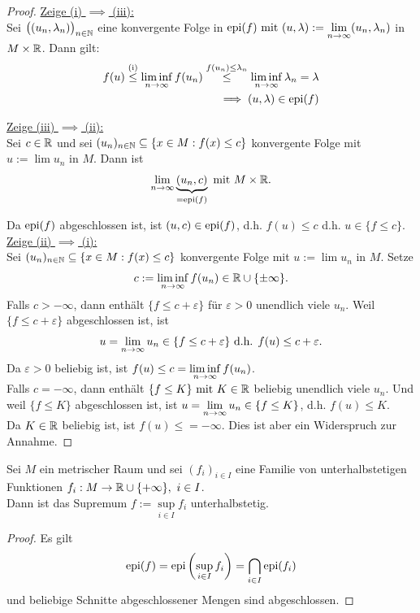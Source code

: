 \begin{proof}
\underline{Zeige (i) $\implies$ (iii):}\\
Sei $\big((u_n,\lambda_n)\big)_{n\in\mathbb{N}}$ eine konvergente Folge in $\text{epi}(f)\text{ mit }(u,\lambda):=\lim\limits_{n\to\infty}(u_n,\lambda_n)$ in $M\times\mathbb{R}$. Dann gilt:
\begin{align*}
f(u)
\stackrel{\text{(i)}}{\leq}
\liminf\limits_{n\to\infty} f(u_n)
\stackrel{f(u_n)\leq\lambda_n}{\leq}
\liminf\limits_{n\to\infty} \lambda_n
=\lambda\\
\implies
(u,\lambda)\in\text{epi}(f)
\end{align*}

\underline{Zeige (iii) $\implies$ (ii):}\\
Sei $c\in\mathbb{R}$ und sei $(u_n)_{n\in\mathbb{N}}\subseteq\lbrace x\in M:f(x)\leq c\rbrace$ konvergente Folge mit $u:=\lim u_n$ in $M$. 
Dann ist
\begin{align*}
	\lim\limits_{n\to\infty}\underbrace{(u_n,c)}_{=\text{epi}(f)}\text{ mit } M\times\mathbb{R}.
\end{align*}

Da $\text{epi}(f)$ abgeschlossen ist, ist $(u,c)\in\text{epi}(f)$, d.h. $f(u)\leq c$ d.h. $u\in\lbrace f\leq c\rbrace$.\\

\underline{Zeige (ii) $\implies$ (i):}\\
Sei $(u_n)_{n\in\mathbb{N}}\subseteq\lbrace x\in M:f(x)\leq c\rbrace$ konvergente Folge mit $u:=\lim u_n$ in $M$. Setze
\begin{align*}
c:=\liminf\limits_{n\to\infty} f(u_n)\in\mathbb{R}\cup\lbrace\pm\infty\rbrace.
\end{align*}
Falls $c>-\infty$, dann enthält $\lbrace f\leq c+\varepsilon\rbrace$ für $\varepsilon>0$ unendlich viele $u_n$. Weil $\lbrace f\leq c+\varepsilon\rbrace$ abgeschlossen ist, ist
\begin{align*}
u=\lim\limits_{n\to\infty} u_n\in\lbrace f\leq c+\varepsilon\rbrace\text{ d.h. } f(u)\leq c+\varepsilon.
\end{align*}
Da $\varepsilon>0$ beliebig ist, ist $f(u)\leq c=\liminf\limits\limits_{n\to\infty} f(u_n)$.\\
Falls $c=-\infty$, dann enthält $\lbrace f\leq K\rbrace\text{ mit } K\in\mathbb{R}$ beliebig unendlich viele $u_n$. Und weil $\lbrace f\leq K\rbrace$ abgeschlossen ist, ist $u=\lim\limits_{n\to\infty} u_n\in\lbrace f\leq K\rbrace$, d.h. $f(u)\leq K$.\\
Da $K\in\mathbb{R}$ beliebig ist, ist $f(u)\leq=-\infty$. Dies ist aber ein Widerspruch zur Annahme.
\end{proof}

\begin{lemma}
Sei $M$ ein metrischer Raum und sei $(f_i)_{i\in I}$ eine Familie von unterhalbstetigen Funktionen $f_i:M\to\mathbb{R}\cup\lbrace+\infty\rbrace,~i\in I$.\\
Dann ist das Supremum $f:=\sup\limits_{i\in I} f_i$ unterhalbstetig.
\end{lemma}
\begin{proof}
Es gilt
\begin{align*}
\text{epi}(f)=\text{epi}\left(\sup\limits_{i\in I} f_i\right)=\bigcap\limits_{i\in I}\text{epi}(f_i)
\end{align*}
und beliebige Schnitte abgeschlossener Mengen sind abgeschlossen.
\end{proof}

